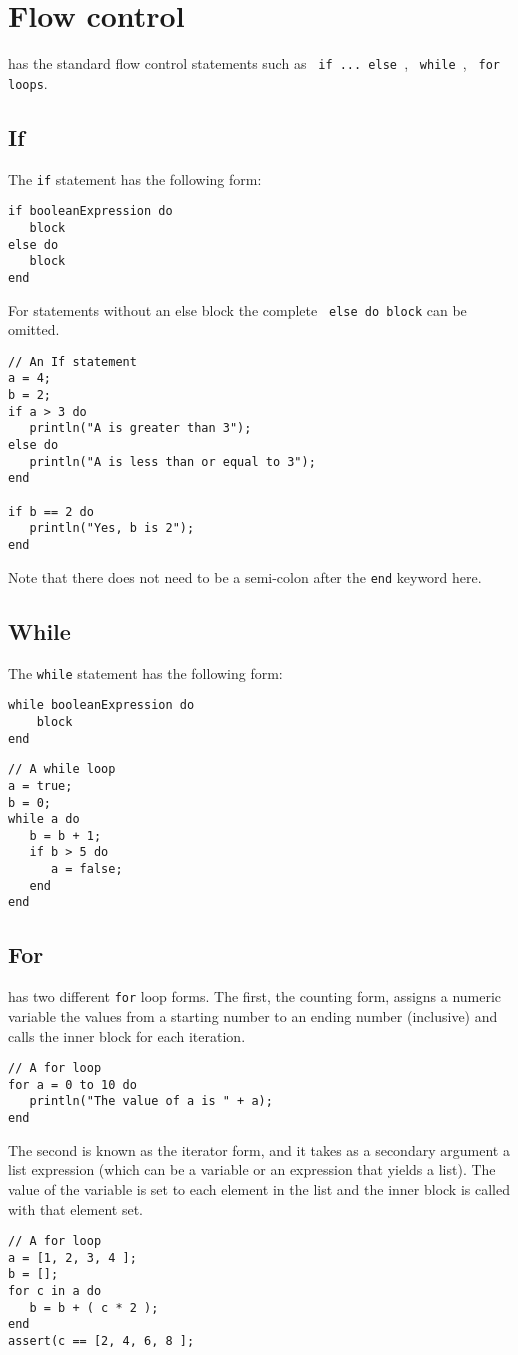\chapter{Flow control}
\Reflex has the standard flow control statements such as \Verb+ if ... else +, \verb+ while +, \verb+ for loops+. 
\section{If}
The \Reflex \Verb+if+  statement has the following form:
\begin{Verbatim}
if booleanExpression do
   block
else do
   block
end
\end{Verbatim}
For statements without an else  block the complete \Verb+ else do block+ can be omitted.

\begin{lstlisting}[caption={If statement}]
// An If statement
a = 4;
b = 2;
if a > 3 do
   println("A is greater than 3");
else do 
   println("A is less than or equal to 3");
end

if b == 2 do
   println("Yes, b is 2");
end
\end{lstlisting}
Note that there does not need to be a semi-colon after the \Verb+end+ keyword here.
\section{While}
The \Reflex \Verb+while+ statement has the following form:
\begin{Verbatim}
while booleanExpression do
    block
end
\end{Verbatim}

\begin{lstlisting}[caption={While statement}]
// A while loop
a = true;
b = 0;
while a do
   b = b + 1;
   if b > 5 do
      a = false;
   end
end
\end{lstlisting}
\section{For}
\Reflex has two different \Verb+for+ loop forms. The first, the counting form, assigns a numeric variable the values from a starting number to an ending number (inclusive) and calls the inner block for each iteration. 
\begin{lstlisting}[caption={For counting form}]
// A for loop
for a = 0 to 10 do
   println("The value of a is " + a);
end
\end{lstlisting}
The second is known as the iterator  form, and it takes as a secondary argument a list expression (which can be a variable or an expression that yields a list). The value of the variable is set to each element in the list and the inner block is called with that element set.
\begin{lstlisting}[caption={For iterator form}]
// A for loop
a = [1, 2, 3, 4 ];
b = [];
for c in a do
   b = b + ( c * 2 );
end
assert(c == [2, 4, 6, 8 ];
\end{lstlisting}
